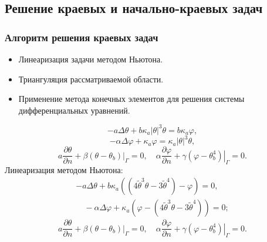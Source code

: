 \subsection{Решение краевых и начально-краевых задач}\label{subsec:solve-direct}
\begin{frame}
    \frametitle{Алгоритм решения краевых задач}
    \begin{itemize}
        \item Линеаризация задачи методом Ньютона.
        \item Триангуляция рассматриваемой области.
        \item Применение метода конечных элементов для решения системы дифференциальных уравнений.
    \end{itemize}
    \begin{equation}
        \label{eq:4_1:1}
        -a \Delta \theta+b \kappa_{a}| \theta|^{3} \theta =
        b \kappa_{a} \varphi,
    \end{equation}
    \begin{equation}
        \label{eq:4_1:2}
        -\alpha \Delta \varphi+\kappa_{a} \varphi =
        \kappa_{a}|\theta|^{3} \theta,
    \end{equation}
    \begin{equation}
        \label{eq:4_1:3}
        a \frac{\partial \theta}{\partial n}
        +\left.\beta\left(\theta-\theta_{b}\right)\right|_{\Gamma}=0,
        \quad \alpha \frac{\partial \varphi}{\partial n}
        +\left.\gamma\left(\varphi-\theta_{b}^{4}\right)\right|_{\Gamma}=0.
    \end{equation}
    Линеаризация методом Ньютона:
    \begin{equation}
        \tag{L1}
        \label{eq:L1}
        \begin{gathered}
            -a \Delta \theta+b \kappa_{a}\left(\left(4 \widetilde{\theta}^{3}
            \theta-3 \widetilde{\theta}^{4}\right)-\varphi\right)=0,\\
            \quad-\alpha \Delta \varphi
            +\kappa_{a}\left(\varphi
            -\left(4 \widetilde{\theta}^{3}
            \theta-3 \widetilde{\theta}^{4}\right)\right)=0;
        \end{gathered}
    \end{equation}
    \begin{equation}
        \tag{L2}
        \label{eq:L2}
        a \frac{\partial \theta}{\partial n}
        +\left.\beta\left(\theta-\theta_{b}\right)\right|_{\Gamma}=0,
        \quad \alpha \frac{\partial \varphi}{\partial n}
        +\left.\gamma\left(\varphi-\theta_{b}^{4}\right)\right|_{\Gamma}=0.
    \end{equation}
\end{frame}

